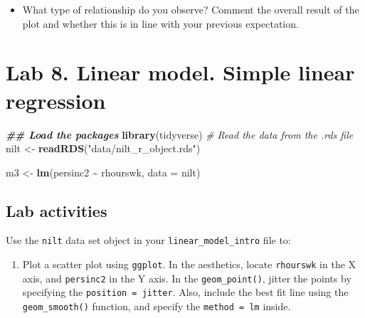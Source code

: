 \documentclass[
]{book}
\newenvironment{Shaded}{\begin{snugshade}}{\end{snugshade}}
\newcommand{\AttributeTok}[1]{\textcolor[rgb]{0.13,0.29,0.53}{#1}}
\newcommand{\CommentTok}[1]{\textcolor[rgb]{0.56,0.35,0.01}{\textit{#1}}}
\newcommand{\DocumentationTok}[1]{\textcolor[rgb]{0.56,0.35,0.01}{\textbf{\textit{#1}}}}
\newcommand{\FunctionTok}[1]{\textcolor[rgb]{0.13,0.29,0.53}{\textbf{#1}}}
\newcommand{\NormalTok}[1]{#1}
\newcommand{\OtherTok}[1]{\textcolor[rgb]{0.56,0.35,0.01}{#1}}
\newcommand{\SpecialCharTok}[1]{\textcolor[rgb]{0.81,0.36,0.00}{\textbf{#1}}}
\newcommand{\StringTok}[1]{\textcolor[rgb]{0.31,0.60,0.02}{#1}}
\providecommand{\tightlist}{%
  \setlength{\itemsep}{0pt}\setlength{\parskip}{0pt}}
\begin{document}
\begin{itemize}
\tightlist
\item
  What type of relationship do you observe? Comment the overall result of the plot and whether this is in line with your previous expectation.
\end{itemize}

\hypertarget{lab-8.-linear-model.-simple-linear-regression}{%
\section{Lab 8. Linear model. Simple linear regression}\label{lab-8.-linear-model.-simple-linear-regression}}

\begin{Shaded}
\begin{Highlighting}[]
\DocumentationTok{\#\# Load the packages}
\FunctionTok{library}\NormalTok{(tidyverse)}
\CommentTok{\# Read the data from the .rds file}
\NormalTok{nilt }\OtherTok{\textless{}{-}} \FunctionTok{readRDS}\NormalTok{(}\StringTok{"data/nilt\_r\_object.rds"}\NormalTok{)}
\end{Highlighting}
\end{Shaded}

\begin{Shaded}
\begin{Highlighting}[]
\NormalTok{m3 }\OtherTok{\textless{}{-}} \FunctionTok{lm}\NormalTok{(persinc2 }\SpecialCharTok{\textasciitilde{}}\NormalTok{ rhourswk, }\AttributeTok{data =}\NormalTok{ nilt)}
\end{Highlighting}
\end{Shaded}

\hypertarget{lab-activities-2}{%
\subsection{Lab activities}\label{lab-activities-2}}

Use the \texttt{nilt} data set object in your \texttt{linear\_model\_intro} file to:

\begin{enumerate}
\def\labelenumi{\arabic{enumi}.}
\tightlist
\item
  Plot a scatter plot using \texttt{ggplot}. In the aesthetics, locate \texttt{rhourswk} in the X axis, and \texttt{persinc2} in the Y axis. In the \texttt{geom\_point()}, jitter the points by specifying the \texttt{position\ =\ \textquotesingle{}jitter\textquotesingle{}}. Also, include the best fit line using the \texttt{geom\_smooth()} function, and specify the \texttt{method\ =\ \textquotesingle{}lm\textquotesingle{}} inside.
\end{enumerate}
\end{document}
